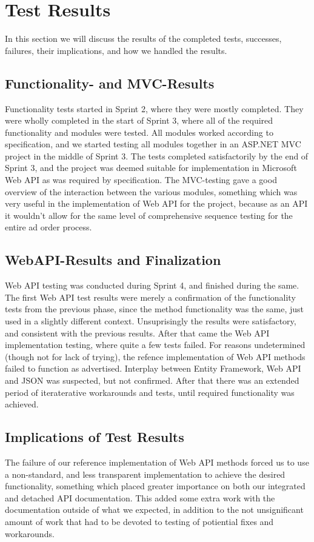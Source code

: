 \section{Test Results}

In this section we will discuss the results of the completed tests, successes, failures, their implications, and how we handled the results. 

\subsection{Functionality- and MVC-Results}

Functionality tests started in Sprint 2, where they were mostly completed. They were wholly completed in the start of Sprint 3, where all of the required
functionality and modules were tested. All modules worked according to specification, and we started testing all modules together in an ASP.NET MVC project
in the middle of Sprint 3. The tests completed satisfactorily by the end of Sprint 3, and the project was deemed suitable for implementation in Microsoft Web API
as was required by specification.
The MVC-testing gave a good overview of the interaction between the various modules, something which was very useful in the implementation of Web API for the project,
because as an API it wouldn't allow for the same level of comprehensive sequence testing for the entire ad order process.

\subsection{WebAPI-Results and Finalization}

Web API testing was conducted during Sprint 4, and finished during the same. The first Web API test results were merely a confirmation of the functionality tests from the previous phase, since the method functionality was the same, just used in a slightly different context. Unsuprisingly the results were satisfactory, and consistent with the previous results.
After that came the Web API implementation testing, where quite a few tests failed. For reasons undetermined (though not for lack of trying), the refence implementation of Web API
methods failed to function as advertised. Interplay between Entity Framework, Web API and JSON was suspected, but not confirmed. After that there was an extended period of iteraterative
workarounds and tests, until required functionality was achieved.


\subsection{Implications of Test Results}

The failure of our reference implementation of Web API methods forced us to use a non-standard, and less transparent implementation to achieve the desired functionality,
something which placed greater importance on both our integrated and detached API documentation. This added some extra work with the documentation outside of what we expected,
in addition to the not unsignificant amount of work that had to be devoted to testing of potiential fixes and workarounds. 


